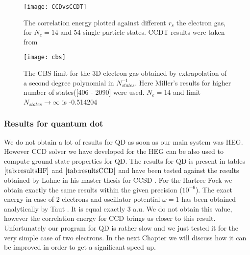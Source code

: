\begin{figure}[ht!]
	\centering
	\texttt{[image: CCDvsCCDT]}
	\caption{The correlation energy plotted against different $r_s$ the  electron gas, for $N_e=14$ and 54 single-particle states. CCDT results were taken from \cite{hansenCoupledClusterStudies}}
	\label{fig:CCDvsCCDT}
\end{figure}

\begin{figure}[ht!]
	\centering
	\texttt{[image: cbs]}
	\caption{The CBS limit for the 3D electron gas obtained by extrapolation of a second degree polynomial in $N_{states}^{-1}$. Here Miller's \cite{millerAntumMechanicalStudies} results for higher number of states([406 - 2090] were used. $N_e=14$ and limit $N_{states} \rightarrow \infty$ is -0.514204  }
	\label{fig:CBS}
\end{figure}



\subsubsection{Results for quantum dot}
We do not obtain a lot of results for QD as soon as our main system was HEG. However CCD solver we have developed for the HEG can be also used to compute ground state properties for QD. The results for QD is present in tables $\ref{tab:resultsHF}$ and  $\ref{tab:resultsCCD}$ and have been tested against the results obtained by Lohne in his master thesis for CCSD \cite{lohneCOUPLEDCLUSTERSTUDIESQUANTUM}. For the Hartree-Fock we obtain exactly the same results within the given precision ($10^{-6}$). 
The exact energy in case of  2 electrons and oscillator potential $\omega=1$ has been obtained analytically by Taut \cite{tautTwoElectronsExternal1993a}. It is equal exactly 3 a.u. We do not obtain this value, however the correlation energy for CCD brings us closer to this result. Unfortunately our program for QD is rather slow and we just tested it for the very simple case of two electrons. In the next Chapter we will discuss how it can be improved in order to get a significant speed up.  

